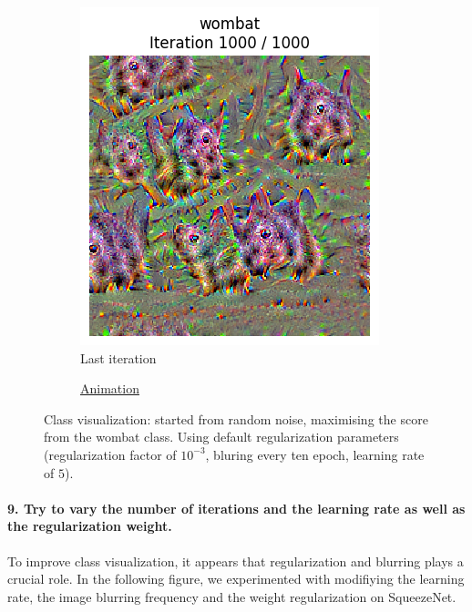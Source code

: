 \begin{figure}[H]
    \centering
    \begin{subfigure}{.5\textwidth}
        \centering
        \includegraphics[width=.7\linewidth]{SqueezeNet/wombat_animated_1000_last_frame.png}
        \caption{Last iteration}
        \label{fig:class_viz_wombat:png}
    \end{subfigure}%
    \begin{subfigure}{.5\textwidth}
        \centering
        \begin{frame}{}
        \end{frame}
        \caption{\href{gifs/SqueezeNet_wombat_animated_1000.mp4}{Animation}}
        \label{fig:class_viz_wombat:vid}
    \end{subfigure}
    \caption{Class visualization: started from random noise, maximising the score from the wombat class. Using default regularization parameters (regularization factor of $10^{-3}$, bluring every ten epoch, learning rate of $5$).}
    \label{fig:class_viz_wombat}
\end{figure}

\paragraph*{9. Try to vary the number of iterations and the learning rate as well as the regularization weight.}
To improve class visualization, it appears that regularization and blurring plays a crucial role. In the following figure, we experimented with modifiying the learning rate, the image blurring frequency and the weight regularization on SqueezeNet.%

